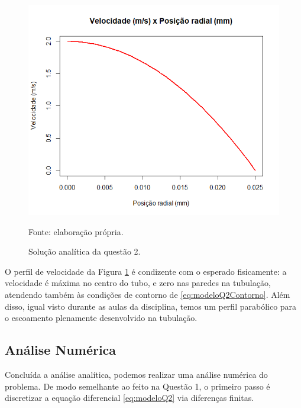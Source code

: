 \begin{figure}[h!]
    \caption{Solução analítica da questão 2.}
    \label{fig:graficoAnaliticoQ2}
    \centering
    \centerline{\includegraphics[scale=0.5]{graficoAnaliticoQ2.png}}
    \par{Fonte: elaboração própria.}
\end{figure}

O perfil de velocidade da Figura \ref*{fig:graficoAnaliticoQ2} é condizente com o 
esperado fisicamente: a velocidade é máxima no centro do tubo, e zero nas paredes na tubulação,
atendendo também às condições de contorno de \eqref{eq:modeloQ2Contorno}.
Além disso, igual visto durante as aulas da disciplina, temos um perfil parabólico para o 
escoamento plenamente desenvolvido na tubulação.

\subsection{Análise Numérica}

Concluída a análise analítica, podemos realizar uma análise numérica do problema. De modo semelhante
ao feito na Questão 1, o primeiro passo é discretizar a equação diferencial \eqref{eq:modeloQ2} via 
diferenças finitas.

